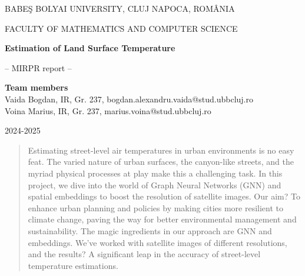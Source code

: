 \documentclass[runningheads,a4paper,11pt]{report}
\begin{document}
\begin{titlepage}
\sloppy

\begin{center}
BABE\c S BOLYAI UNIVERSITY, CLUJ NAPOCA, ROM\^ ANIA

FACULTY OF MATHEMATICS AND COMPUTER SCIENCE

\vspace{6cm}

\Huge \textbf{Estimation of Land Surface Temperature}

\vspace{1cm}

\normalsize -- MIRPR report --

\end{center}


\vspace{5cm}

\begin{flushright}
\Large{\textbf{Team members}}\\
Vaida Bogdan, IR, Gr. 237, bogdan.alexandru.vaida@stud.ubbcluj.ro\\
Voina Marius, IR, Gr. 237, marius.voina@stud.ubbcluj.ro

\end{flushright}

\vspace{4cm}

\begin{center}
2024-2025
\end{center}

\end{titlepage}


\begin{abstract}
Estimating street-level air temperatures in urban environments is no easy feat. The varied nature of urban surfaces, the canyon-like streets, and the myriad physical processes at play make this a challenging task. In this project, we dive into the world of Graph Neural Networks (GNN) and spatial embeddings to boost the resolution of satellite images. Our aim? To enhance urban planning and policies by making cities more resilient to climate change, paving the way for better environmental management and sustainability. The magic ingredients in our approach are GNN and embeddings. We've worked with satellite images of different resolutions, and the results? A significant leap in the accuracy of street-level temperature estimations.
\end{abstract}
\end{document}
